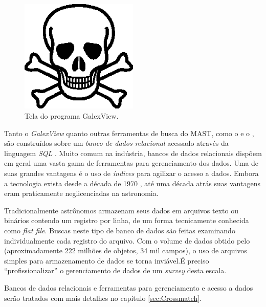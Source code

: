\begin{figure}
	\includegraphics[width=0.5\textwidth]{figuras/test.eps}
	\caption[Tela do programa GalexView.]
	{Tela do programa GalexView.}
	\label{fig:GalexView}
\end{figure}

Tanto o {\em GalexView} quanto outras ferramentas de busca do MAST, como o
 e o , são construídos sobre um
{\em banco de dados relacional} acessado através da linguagem {\em SQL}
\citep{Chamberlin1974}. Muito comum na indústria, bancos de dados relacionais
dispõem em geral uma vasta gama de ferramentas para gerenciamento dos dados. Uma
de suas grandes vantagens é o uso de {\em índices} para agilizar o acesso a
dados. Embora a tecnologia exista desde a década de 1970 \citep{Codd1970}, até
uma década atrás suas vantagens eram praticamente neglicenciadas na astronomia.

Tradicionalmente astrônomos armazenam seus dados em arquivos texto ou binários
contendo um registro por linha, de um forma tecnicamente conhecida como {\em
flat file}. Buscas neste tipo de banco de dados são feitas examinando
individualmente cada registro do arquivo. Com o volume de dados obtido pelo
\galex (aproximadamente 222 milhões de objetos, 34 mil campos)\citneed, o uso
de arquivos simples para armazenamento de dados se torna inviável.\citneed É
preciso ``profissionalizar'' o gerenciamento de dados de um {\em survey} desta
escala.

Bancos de dados relacionais e ferramentas para gerenciamento e acesso a dados
serão tratados com mais detalhes no capítulo \ref{sec:Crossmatch}.



